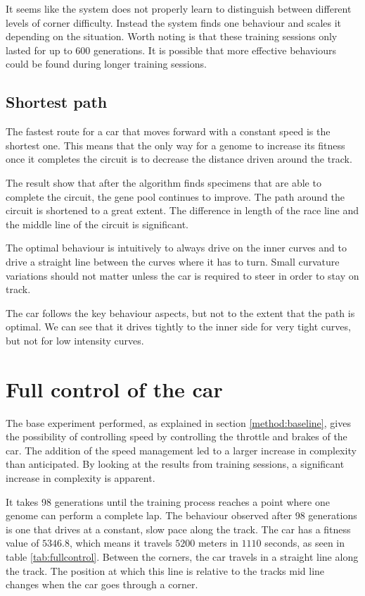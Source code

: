 It seems like the system does not properly learn to distinguish between different levels of corner difficulty. Instead the system finds one behaviour and scales it depending on the situation. Worth noting is that these training sessions only lasted for up to $600$ generations. It is possible that more effective behaviours could be found during longer training sessions. 

\subsection{Shortest path}
\label{sec:shortest}
The fastest route for a car that moves forward with a constant speed is the shortest one. This means that the only way for a genome to increase its fitness once it completes the circuit is to decrease the distance driven around the track.  

The result show that after the algorithm finds specimens that are able to complete the circuit, the gene pool continues to improve. The path around the circuit is shortened to a great extent. The difference in length of the race line and the middle line of the circuit is significant. 

The optimal behaviour is intuitively to always drive on the inner curves and to drive a straight line between the curves where it has to turn. Small curvature variations should not matter unless the car is required to steer in order to stay on track. 

The car follows the key behaviour aspects, but not to the extent that the path is optimal. We can see that it drives tightly to the inner side for very tight curves, but not for low intensity curves.


\section{Full control of the car}

The base experiment performed, as explained in section \ref{method:baseline}, gives the possibility of controlling speed by controlling the throttle and brakes of the car. The addition of the speed management led to a larger increase in complexity than anticipated. By looking at the results from training sessions, a significant increase in complexity is apparent.

It takes 98 generations until the training process reaches a point where one genome can perform a complete lap. The behaviour observed after 98 generations is one that drives at a constant, slow pace along the track. The car has a fitness value of $5346.8$, which means it travels $5200$ meters in $1110$ seconds, as seen in table \ref{tab:fullcontrol}. Between the corners, the car travels in a straight line along the track. The position at which this line is relative to the tracks mid line changes when the car goes through a corner.

